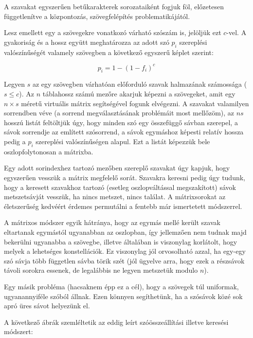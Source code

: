 \documentclass[
    parspace,
    noindent,
    nohyp,
]{elteiktdk}[2023/04/10]
\begin{document}
A szavakat egyszerűen betűkarakterek sorozataiként fogjuk föl,
előzetesen függetlenítve a központozás, szövegfelépítés problematikájától.

Lesz emellett egy a szövegekre vonatkozó várható szószám is, jelöljük ezt $c$-vel.
A gyakoriság és a hossz együtt meghatározza az adott szó
$p_i$ szereplési valószínűségét valamely szövegben a következő egyszerű képlet szerint:

$$
p_i = 1 - (1 - f_i)^c
$$

Legyen $s$ az egy szövegben várhatóan előforduló szavak halmazának számossága ($s \leq c$).
Az $n$ táblahossz számú mezőre akarjuk képezni a szövegeket,
amit egy $n \times s$ méretű virtuális mátrix segítségével fogunk elvégezni.
A szavakat valamilyen sorrendben véve (a sorrend megválasztásának problémáit most mellőzöm),
az $n s$ hosszú listát feltöltjük úgy, hogy minden szó egy összefüggő sávban szerepel,
a sávok sorrendje az említett szósorrend,
a sávok egymáshoz képesti relatív hossza pedig a $p_i$ szereplési valószínűségen alapul.
Ezt a listát képezzük bele oszlopfolytonosan a mátrixba.

Egy adott sorindexhez tartozó mezőben szereplő szavakat úgy kapjuk,
hogy egyszerűen vesszük a mátrix megfelelő sorát.
Szavakra keresni pedig úgy tudunk, hogy a keresett szavakhoz tartozó
(esetleg oszlopváltással megszakított) sávok metszetsávját vesszük,
ha nincs metszet, nincs találat.
A mátrixsorokat az életszerűség kedvéért érdemes permutálni a fentebb már ismertetett módszerrel.

A mátrixos módszer egyik hátránya,
hogy az egymás mellé került szavak eltartanak egymástól ugyanabban az oszlopban,
így jellemzően nem tudnak majd bekerülni ugyanabba a szövegbe,
illetve általában is viszonylag korlátolt,
hogy melyek a lehetséges konstellációk.
Ez viszonylag jól orvosolható azzal, ha egy-egy szó sávja több független sávba törik szét
(jól ügyelve arra, hogy ezek a részsávok távoli sorokra essenek,
de legalábbis ne legyen metszetük modulo $n$).

Egy másik probléma (hacsaknem épp ez a cél), hogy a szövegek túl uniformak, ugyanannyiféle szóból állnak.
Ezen könnyen segíthetünk, ha a szósávok közé sok apró üres sávot helyezünk el.

A következő ábrák szemléltetik az eddig leírt szóösszeállítási illetve keresési módszert:
\end{document}
